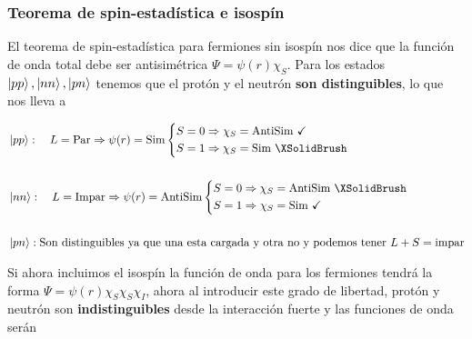 \subsubsection{Teorema de spin-estadística e isospín}
El teorema de spin-estadística para fermiones sin isospín nos dice que la función de onda total debe ser antisimétrica $\Psi=\psi(r)\chi_{S}$. Para los estados $\ket{pp},\ket{nn},\ket{pn}$ tenemos que el protón y el neutrón \textbf{son distinguibles}, lo que nos lleva a 

\begin{equation*}
    \begin{aligned}
        & \ket{pp}: \quad L=\mathrm{Par} \Rightarrow \psi(r)=\mathrm{Sim} \left \{ \begin{aligned}
            &S=0 \Rightarrow \chi_S=\text{AntiSim \checkmark}\\
            &S=1 \Rightarrow \chi_S=\text{Sim \XSolidBrush}
        \end{aligned}\right.\\\\
        & \ket{nn}: \quad L=\mathrm{Impar} \Rightarrow \psi(r)=\mathrm{AntiSim} \left \{ \begin{aligned}
            &S=0 \Rightarrow \chi_S=\text{AntiSim \XSolidBrush}\\
            &S=1 \Rightarrow \chi_S=\text{Sim \checkmark}
        \end{aligned}\right.\\\\
        & \ket{pn}: \text{Son distinguibles ya que una esta cargada y otra no y podemos tener }L+S=\text{impar} 
    \end{aligned}
\end{equation*}

 Si ahora incluimos el isospín la función de onda para los fermiones tendrá la forma $\Psi=\psi(r)\chi_{S}\chi_{S}\chi_{I}$, ahora al introducir este grado de libertad, protón y neutrón son \textbf{indistinguibles} desde la interacción fuerte y las funciones de onda serán

